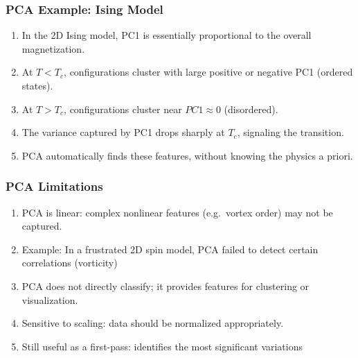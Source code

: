 \documentclass{beamer}
\begin{document}
\begin{frame}
\frametitle{PCA Example: Ising Model}

\begin{enumerate}
\item In the 2D Ising model, PC1 is essentially proportional to the overall magnetization.

\item At $T<T_c$, configurations cluster with large positive or negative PC1 (ordered states).

\item At $T>T_c$, configurations cluster near $PC1 \approx 0$ (disordered).

\item The variance captured by PC1 drops sharply at $T_c$, signaling the transition.

\item PCA automatically finds these features, without knowing the physics a priori.
\end{enumerate}

\noindent
\end{frame}

\begin{frame}
\frametitle{PCA Limitations}

\begin{enumerate}
\item PCA is linear: complex nonlinear features (e.g.\ vortex order) may not be captured.

\item Example: In a frustrated 2D spin model, PCA failed to detect certain correlations (vorticity) 

\item PCA does not directly classify; it provides features for clustering or visualization.

\item Sensitive to scaling: data should be normalized appropriately.

\item Still useful as a first-pass: identifies the most significant variations 
\end{enumerate}

\noindent
\end{frame}
\end{document}
